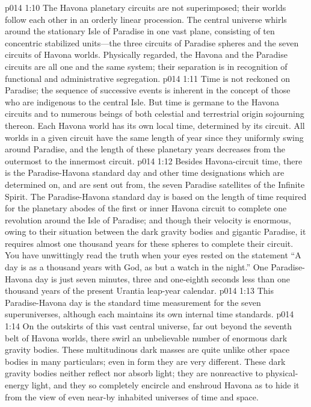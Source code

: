 \vs p014 1:10 The Havona planetary circuits are not superimposed; their worlds follow each other in an orderly linear procession. The central universe whirls around the stationary Isle of Paradise in one vast plane, consisting of ten concentric stabilized units---the three circuits of Paradise spheres and the seven circuits of Havona worlds. Physically regarded, the Havona and the Paradise circuits are all one and the same system; their separation is in recognition of functional and administrative segregation.
\pc \vs p014 1:11 Time is not reckoned on Paradise; the sequence of successive events is inherent in the concept of those who are indigenous to the central Isle. But time is germane to the Havona circuits and to numerous beings of both celestial and terrestrial origin sojourning thereon. Each Havona world has its own local time, determined by its circuit. All worlds in a given circuit have the same length of year since they uniformly swing around Paradise, and the length of these planetary years decreases from the outermost to the innermost circuit.
\vs p014 1:12 Besides Havona\hyp{}circuit time, there is the Paradise\hyp{}Havona standard day and other time designations which are determined on, and are sent out from, the seven Paradise satellites of the Infinite Spirit. The Paradise\hyp{}Havona standard day is based on the length of time required for the planetary abodes of the first or inner Havona circuit to complete one revolution around the Isle of Paradise; and though their velocity is enormous, owing to their situation between the dark gravity bodies and gigantic Paradise, it requires almost one thousand years for these spheres to complete their circuit. You have unwittingly read the truth when your eyes rested on the statement “A day is as a thousand years with God, as but a watch in the night.” One Paradise\hyp{}Havona day is just seven minutes, three and one\hyp{}eighth seconds less than one thousand years of the present Urantia leap\hyp{}year calendar.
\vs p014 1:13 This Paradise\hyp{}Havona day is the standard time measurement for the seven superuniverses, although each maintains its own internal time standards.
\pc \vs p014 1:14 On the outskirts of this vast central universe, far out beyond the seventh belt of Havona worlds, there swirl an unbelievable number of enormous dark gravity bodies. These multitudinous dark masses are quite unlike other space bodies in many particulars; even in form they are very different. These dark gravity bodies neither reflect nor absorb light; they are nonreactive to physical\hyp{}energy light, and they so completely encircle and enshroud Havona as to hide it from the view of even near\hyp{}by inhabited universes of time and space.
